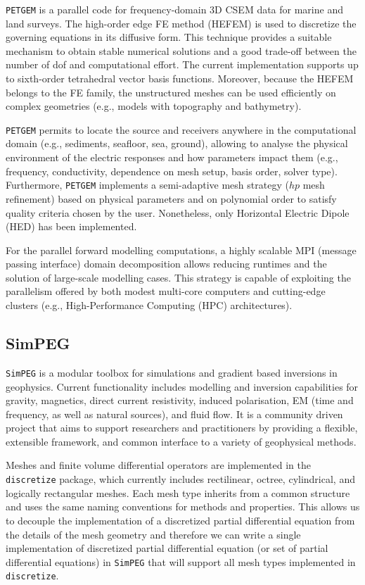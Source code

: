 \documentclass[
    paper,
  ]{geophysics}
\newcommand{\simpeg}{\texttt{SimPEG}\xspace}
\newcommand{\discretize}{\texttt{discretize}\xspace}
\newcommand{\petgem}{\texttt{PETGEM}\xspace}
\begin{document}
\petgem is a parallel code for frequency-domain 3D CSEM data for marine and land surveys. The high-order edge FE method (HEFEM) is used to discretize the governing equations in its diffusive form. This technique provides a suitable mechanism to obtain stable numerical solutions and a good trade-off between the number of dof and computational effort. The current implementation supports up to sixth-order tetrahedral vector basis functions. Moreover, because the HEFEM belongs to the FE family, the unstructured meshes can be used efficiently on complex geometries (e.g., models with topography and bathymetry).

\petgem permits to locate the source and receivers anywhere in the computational domain (e.g., sediments, seafloor, sea, ground), allowing to analyse the physical environment of the electric responses and how parameters impact them (e.g., frequency, conductivity, dependence on mesh setup, basis order, solver type). Furthermore, \petgem implements a semi-adaptive mesh strategy ($hp$ mesh refinement) based on physical parameters and on polynomial order to satisfy quality criteria chosen by the user. Nonetheless, only Horizontal Electric Dipole (HED) has been implemented.

For the parallel forward modelling computations, a highly scalable MPI (message passing interface) domain decomposition allows reducing runtimes and the solution of large-scale modelling cases. This strategy is capable of exploiting the parallelism offered by both modest multi-core computers and cutting-edge clusters (e.g., High-Performance Computing (HPC) architectures).

\subsection{SimPEG}

\simpeg is a modular toolbox for simulations and gradient based inversions in geophysics. Current functionality includes modelling and inversion capabilities for gravity, magnetics, direct current resistivity, induced polarisation, EM (time and frequency, as well as natural sources), and fluid flow. It is a community driven project that aims to support researchers and practitioners by providing a flexible, extensible framework, and common interface to a variety of geophysical methods. 

Meshes and finite volume differential operators are implemented in the \discretize package, which currently includes rectilinear, octree, cylindrical, and logically rectangular meshes. Each mesh type inherits from a common structure and uses the same naming conventions for methods and properties. This allows us to decouple the implementation of a discretized partial differential equation from the details of the mesh geometry and therefore we can write a single implementation of discretized partial differential equation (or set of partial differential equations) in \simpeg that will support all mesh types implemented in \discretize.
\end{document}
